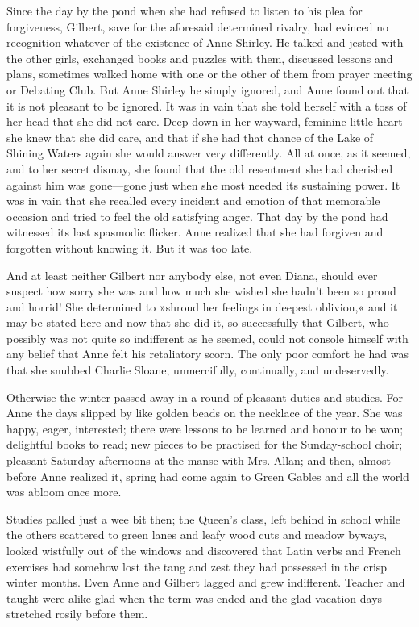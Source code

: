 Since the day by the pond when she had refused to listen to his plea for forgiveness, Gilbert, save for the aforesaid determined rivalry, had evinced no recognition whatever of the existence of Anne Shirley. He talked and jested with the other girls, exchanged books and puzzles with them, discussed lessons and plans, sometimes walked home with one or the other of them from prayer meeting or Debating Club. But Anne Shirley he simply ignored, and Anne found out that it is not pleasant to be ignored. It was in vain that she told herself with a toss of her head that she did not care. Deep down in her wayward, feminine little heart she knew that she did care, and that if she had that chance of the Lake of Shining Waters again she would answer very differently. All at once, as it seemed, and to her secret dismay, she found that the old resentment she had cherished against him was gone—gone just when she most needed its sustaining power. It was in vain that she recalled every incident and emotion of that memorable occasion and tried to feel the old satisfying anger. That day by the pond had witnessed its last spasmodic flicker. Anne realized that she had forgiven and forgotten without knowing it. But it was too late.

And at least neither Gilbert nor anybody else, not even Diana, should ever suspect how sorry she was and how much she wished she hadn’t been so proud and horrid! She determined to »shroud her feelings in deepest oblivion,« and it may be stated here and now that she did it, so successfully that Gilbert, who possibly was not quite so indifferent as he seemed, could not console himself with any belief that Anne felt his retaliatory scorn. The only poor comfort he had was that she snubbed Charlie Sloane, unmercifully, continually, and undeservedly.

Otherwise the winter passed away in a round of pleasant duties and studies. For Anne the days slipped by like golden beads on the necklace of the year. She was happy, eager, interested; there were lessons to be learned and honour to be won; delightful books to read; new pieces to be practised for the Sunday-school choir; pleasant Saturday afternoons at the manse with Mrs. Allan; and then, almost before Anne realized it, spring had come again to Green Gables and all the world was abloom once more.

Studies palled just a wee bit then; the Queen’s class, left behind in school while the others scattered to green lanes and leafy wood cuts and meadow byways, looked wistfully out of the windows and discovered that Latin verbs and French exercises had somehow lost the tang and zest they had possessed in the crisp winter months. Even Anne and Gilbert lagged and grew indifferent. Teacher and taught were alike glad when the term was ended and the glad vacation days stretched rosily before them.

